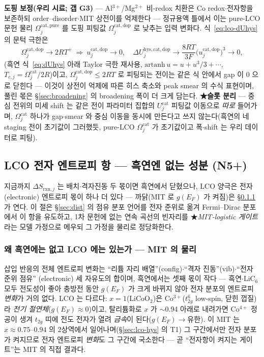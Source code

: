 \documentclass[11pt,a4paper]{article}
\newcommand{\rxn}{\mathrm{rxn}}
\newcommand{\hys}{\mathrm{hys}}
\begin{document}
\textbf{도핑 보정(우리 시료; 갭 G3)} —
Al$^{3+}$/Mg$^{2+}$ 비-redox 치환은 Co redox$\cdot$전자항을 보존하되 order--disorder$\cdot$MIT 상전이를
억제한다 — 정규용액 틀에서 이는 pure-LCO 문헌 물리 $\Omega_j^\mathrm{cat,pure}$ 를 도핑 피팅값
$\Omega_j^\mathrm{cat,dop}$ 로 낮추는 입력 변화다. 식~\eqref{eq:lco-dUhys} 의 문턱 극한은
\begin{equation}
\Omega_j^\mathrm{cat,dop}\to2RT^+\ \Longrightarrow\
u_j^\mathrm{cat,dop}\to0,\quad
\Delta U_j^{\hys,\mathrm{cat,dop}}\to\frac{8RT}{3F}\big(u_j^\mathrm{cat,dop}\big)^3\to0,
\label{eq:lco-dope}
\end{equation}
(흑연 식~\eqref{eq:dUhys} 아래 Taylor 극한 재사용, $\mathrm{artanh}\,u=u+u^3/3+\cdots$,
$T_{c,j}=\Omega_j^\mathrm{cat}/2R$)이고, $\Omega_j^\mathrm{cat,dop}\le2RT$ 로 피팅되는 전이는 같은 식 안에서
gap 이 0 으로 닫힌다 — 이것이 상전이 억제에 따른 히스 축소와 peak smear 의 수식 표현이며, 풀린 몫은
\S\ref{sec:broadening} 의 broadening 폭이 더 크게 담는다. \textbf{★슬롯 분리} — 중심 전위의 미세 shift 는
같은 전이 파라미터 집합의 $U_j^\mathrm{cat}$ 피팅값 이동으로 \emph{따로} 들어가며, $\Omega_j^\mathrm{cat}$ 하나가
gap$\cdot$smear 와 중심 이동을 동시에 만든다고 쓰지 않는다(흑연의 네 staging 전이 초기값이 그러했듯,
pure-LCO $\Omega_j^\mathrm{cat}$ 가 초기값이고 폭$\cdot$shift 는 우리 데이터로 피팅).

\subsection{LCO 전자 엔트로피 항 — 흑연엔 없는 성분 (N5+)}\label{sec:lco-electronic}
지금까지 $\Delta S_{\rxn,j}$ 는 배치$\cdot$격자진동 두 몫이면 흑연에서 닫혔으나, LCO 양극은 전자(electronic) 엔트로피
몫이 하나 더 있다 — 까닭(MIT 로 $g(E_F)$ 가 켜짐)은 \S\ref{sec:lco-why} 가 연다.
이 절은 \S\ref{sec:dist} 의 점유 분포 언어를 전자 준위로 옮겨 Fermi--Dirac 분포에서 이 항을 유도하고,
1차 문헌에 없는 연속 곡선의 빈자리를 ★\emph{MIT-logistic 게이트}라는 모델 가정으로 메우되 그 가정을 물리로
정당화한다.

\subsubsection{왜 흑연에는 없고 LCO 에는 있는가 --- MIT 의 물리}\label{sec:lco-why}
삽입 반응의 전체 엔트로피 변화는 ``리튬 자리 배열''(config)$\cdot$``격자 진동''(vib)$\cdot$``전자 준위 점유''
(electronic) 세 자유도의 합이며, 흑연에서는 셋째 몫이 작다 — 흑연$\cdot$$\mathrm{LiC_6}$ 모두 전도성이 좋아
충방전 동안 $g(E_F)$ 가 크게 바뀌지 않아 전자 분포의 엔트로피 \emph{변화}가 거의 없다. LCO 는 다르다:
$x{=}1$($\mathrm{LiCoO_2}$)은 Co$^{3+}$($t_{2g}^6$ low-spin, 닫힌 껍질)라 \emph{전기 절연체}($g(E_F)\!\approx\!0$)이고,
탈리튬화로 $x$ 가 $\sim$0.94 아래로 내려가면 Co$^{4+}$ 정공이 생겨 $t_{2g}$ 띠에 전도 전자가 열려 \emph{금속}이
된다($g(E_F)\!\to\!$유한)\cite{menetrier1999,motohashi2009}. 이 MIT 는 $x\approx0.75$--$0.94$ 의 2상역에서
일어나며(\S\ref{sec:lco-hys} 의 T1) 그 구간에서만 전자 분포가 켜지므로 전자 엔트로피 \emph{변화}도 그 구간에
국소한다 — 곧 ``전자항이 켜지는 게이트''는 MIT 의 직접 결과다.
\end{document}

